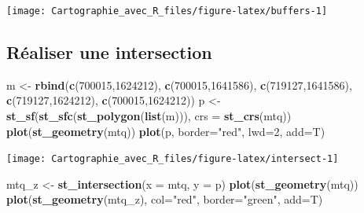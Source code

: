 \documentclass[]{book}
\newenvironment{Shaded}{\begin{snugshade}}{\end{snugshade}}
\newcommand{\KeywordTok}[1]{\textcolor[rgb]{0.13,0.29,0.53}{\textbf{#1}}}
\newcommand{\DataTypeTok}[1]{\textcolor[rgb]{0.13,0.29,0.53}{#1}}
\newcommand{\DecValTok}[1]{\textcolor[rgb]{0.00,0.00,0.81}{#1}}
\newcommand{\StringTok}[1]{\textcolor[rgb]{0.31,0.60,0.02}{#1}}
\newcommand{\NormalTok}[1]{#1}
\begin{document}
\begin{center}\texttt{[image: Cartographie\_avec\_R\_files/figure-latex/buffers-1]} \end{center}

\subsection{Réaliser une intersection}\label{realiser-une-intersection}

\begin{Shaded}
\begin{Highlighting}[]
\NormalTok{m <-}\StringTok{ }\KeywordTok{rbind}\NormalTok{(}\KeywordTok{c}\NormalTok{(}\DecValTok{700015}\NormalTok{,}\DecValTok{1624212}\NormalTok{), }\KeywordTok{c}\NormalTok{(}\DecValTok{700015}\NormalTok{,}\DecValTok{1641586}\NormalTok{), }\KeywordTok{c}\NormalTok{(}\DecValTok{719127}\NormalTok{,}\DecValTok{1641586}\NormalTok{), }
           \KeywordTok{c}\NormalTok{(}\DecValTok{719127}\NormalTok{,}\DecValTok{1624212}\NormalTok{), }\KeywordTok{c}\NormalTok{(}\DecValTok{700015}\NormalTok{,}\DecValTok{1624212}\NormalTok{))}
\NormalTok{p <-}\StringTok{ }\KeywordTok{st_sf}\NormalTok{(}\KeywordTok{st_sfc}\NormalTok{(}\KeywordTok{st_polygon}\NormalTok{(}\KeywordTok{list}\NormalTok{(m))), }\DataTypeTok{crs =} \KeywordTok{st_crs}\NormalTok{(mtq))}
\KeywordTok{plot}\NormalTok{(}\KeywordTok{st_geometry}\NormalTok{(mtq))}
\KeywordTok{plot}\NormalTok{(p, }\DataTypeTok{border=}\StringTok{"red"}\NormalTok{, }\DataTypeTok{lwd=}\DecValTok{2}\NormalTok{, }\DataTypeTok{add=}\NormalTok{T)}
\end{Highlighting}
\end{Shaded}

\begin{center}\texttt{[image: Cartographie\_avec\_R\_files/figure-latex/intersect-1]} \end{center}

\begin{Shaded}
\begin{Highlighting}[]
\NormalTok{mtq_z <-}\StringTok{ }\KeywordTok{st_intersection}\NormalTok{(}\DataTypeTok{x =}\NormalTok{ mtq, }\DataTypeTok{y =}\NormalTok{ p)}
\KeywordTok{plot}\NormalTok{(}\KeywordTok{st_geometry}\NormalTok{(mtq))}
\KeywordTok{plot}\NormalTok{(}\KeywordTok{st_geometry}\NormalTok{(mtq_z), }\DataTypeTok{col=}\StringTok{"red"}\NormalTok{, }\DataTypeTok{border=}\StringTok{"green"}\NormalTok{, }\DataTypeTok{add=}\NormalTok{T)}
\end{Highlighting}
\end{Shaded}
\end{document}
